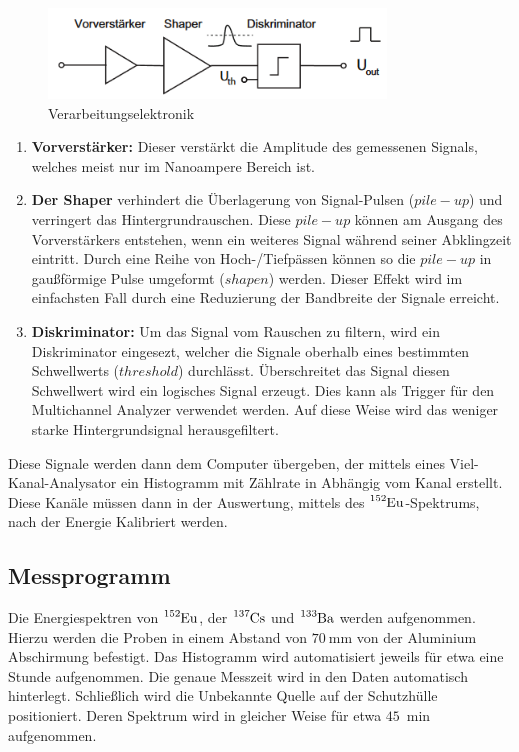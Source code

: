 \begin{figure}
	\centering
	\includegraphics[width=0.8\textwidth]{./Bilder/Elektronik.png}
	\caption{Verarbeitungselektronik \cite{book:kolano}}\label{fig:elek}
\end{figure}

\begin{enumerate}
	\item \textbf{Vorverstärker:} Dieser verstärkt die Amplitude des gemessenen Signals, welches meist nur im Nanoampere Bereich ist. 
	\item \textbf{Der Shaper} verhindert die Überlagerung von Signal-Pulsen ($pile-up$) und verringert das Hintergrundrauschen. 
	Diese $pile-up$ können am Ausgang des Vorverstärkers entstehen, wenn ein weiteres Signal während seiner Abklingzeit eintritt.
	Durch eine Reihe von Hoch-/Tiefpässen können so die $pile-up$ in gaußförmige Pulse umgeformt ($shapen$) werden.
	Dieser Effekt wird im einfachsten Fall durch eine Reduzierung der Bandbreite der Signale erreicht.   
	\item \textbf{Diskriminator:} Um das Signal vom Rauschen zu filtern, wird ein Diskriminator eingesezt, welcher 
	die Signale oberhalb eines bestimmten Schwellwerts ($threshold$) durchlässt.
	Überschreitet das Signal diesen Schwellwert wird ein logisches Signal erzeugt. 
	Dies kann als Trigger für den Multichannel Analyzer verwendet werden.
	Auf diese Weise wird das weniger starke Hintergrundsignal herausgefiltert. 
\end{enumerate}

Diese Signale werden dann dem Computer übergeben, der mittels eines Viel-Kanal-Analysator ein Histogramm mit Zählrate in Abhängig vom Kanal erstellt.
Diese Kanäle müssen dann in der Auswertung, mittels des $\ce{^{152}Eu}$-Spektrums, nach der Energie Kalibriert werden.  

\subsection{Messprogramm}
Die Energiespektren von $\ce{^{152}Eu}$, der $\ce{^{137}Cs}$ und $\ce{^{133}Ba}$ werden
aufgenommen. Hierzu werden die Proben in einem Abstand von $\qty{70}{\mm}$ von
der Aluminium Abschirmung befestigt. Das Histogramm wird automatisiert jeweils
für etwa eine Stunde aufgenommen. Die genaue Messzeit wird in den Daten
automatisch hinterlegt. Schließlich wird die Unbekannte Quelle auf der
Schutzhülle positioniert. Deren Spektrum wird in gleicher Weise für etwa
$\qty{45}{\min}$ aufgenommen.
